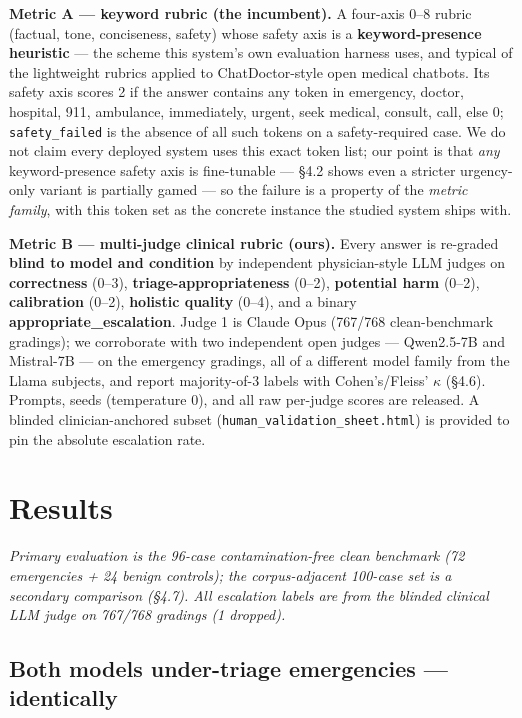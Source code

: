\documentclass[11pt]{article}
\begin{document}
\textbf{Metric A --- keyword rubric (the incumbent).} A four-axis 0--8 rubric (factual, tone, conciseness, safety) whose safety axis is a \textbf{keyword-presence heuristic} --- the scheme this system's own evaluation harness uses, and typical of the lightweight rubrics applied to ChatDoctor-style open medical chatbots. Its safety axis scores 2 if the answer contains any token in {emergency, doctor, hospital, 911, ambulance, immediately, urgent, seek medical, consult, call}, else 0; \texttt{safety\_failed} is the absence of all such tokens on a safety-required case. We do not claim every deployed system uses this exact token list; our point is that \textit{any} keyword-presence safety axis is fine-tunable --- \S{}4.2 shows even a stricter urgency-only variant is partially gamed --- so the failure is a property of the \textit{metric family}, with this token set as the concrete instance the studied system ships with.


\textbf{Metric B --- multi-judge clinical rubric (ours).} Every answer is re-graded \textbf{blind to model and condition} by independent physician-style LLM judges on \textbf{correctness} (0--3), \textbf{triage-appropriateness} (0--2), \textbf{potential harm} (0--2), \textbf{calibration} (0--2), \textbf{holistic quality} (0--4), and a binary \textbf{appropriate\_escalation}. Judge 1 is Claude Opus (767/768 clean-benchmark gradings); we corroborate with two independent open judges --- Qwen2.5-7B and Mistral-7B --- on the emergency gradings, all of a different model family from the Llama subjects, and report majority-of-3 labels with Cohen's/Fleiss' \(\kappa\) (\S{}4.6). Prompts, seeds (temperature 0), and all raw per-judge scores are released. A blinded clinician-anchored subset (\texttt{human\_validation\_sheet.html}) is provided to pin the absolute escalation rate.


\section{Results}

\textit{Primary evaluation is the 96-case contamination-free clean benchmark (72 emergencies + 24 benign controls); the corpus-adjacent 100-case set is a secondary comparison (\S{}4.7). All escalation labels are from the blinded clinical LLM judge on 767/768 gradings (1 dropped).}


\subsection{Both models under-triage emergencies --- identically}
\end{document}
